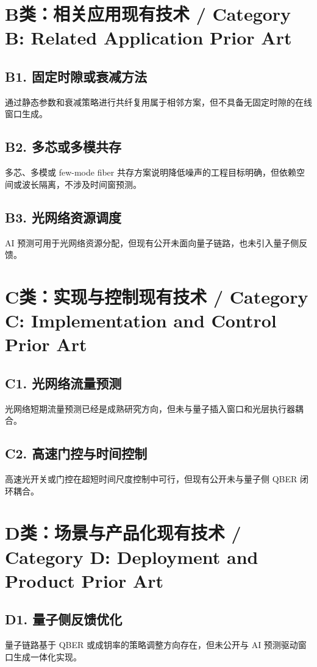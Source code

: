 ﻿\documentclass[12pt,a4paper]{article}
\begin{document}
\section{B类：相关应用现有技术 / Category B: Related Application Prior Art}
\subsection{B1. 固定时隙或衰减方法}
通过静态参数和衰减策略进行共纤复用属于相邻方案，但不具备无固定时隙的在线窗口生成。

\subsection{B2. 多芯或多模共存}
多芯、多模或 few-mode fiber 共存方案说明降低噪声的工程目标明确，但依赖空间或波长隔离，不涉及时间窗预测。

\subsection{B3. 光网络资源调度}
AI 预测可用于光网络资源分配，但现有公开未面向量子链路，也未引入量子侧反馈。

\section{C类：实现与控制现有技术 / Category C: Implementation and Control Prior Art}
\subsection{C1. 光网络流量预测}
光网络短期流量预测已经是成熟研究方向，但未与量子插入窗口和光层执行器耦合。

\subsection{C2. 高速门控与时间控制}
高速光开关或门控在超短时间尺度控制中可行，但现有公开未与量子侧 QBER 闭环耦合。

\section{D类：场景与产品化现有技术 / Category D: Deployment and Product Prior Art}
\subsection{D1. 量子侧反馈优化}
量子链路基于 QBER 或成钥率的策略调整方向存在，但未公开与 AI 预测驱动窗口生成一体化实现。
\end{document}
